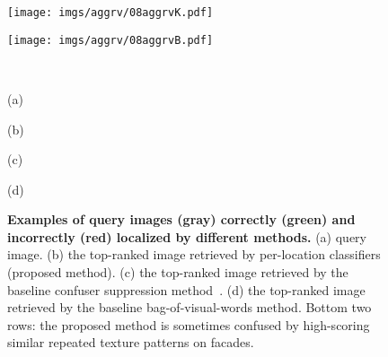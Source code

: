 \begin{figure*}[!ht]
{\begin{minipage}{\subw}
		  \centerline{
		  \texttt{[image: imgs/aggrv/08aggrvK.pdf]}
		  }
		\end{minipage}
	 }
	 \colorbox{myGreen}{
		\begin{minipage}{\subw}
		  \centerline{
		  \texttt{[image: imgs/aggrv/08aggrvB.pdf]}
		  }
		\end{minipage}
	 }
	 \\
	 \begin{minipage}{0.23\linewidth}
		\centering
		(a)
	 \end{minipage}
	 \hspace{3mm}
	 \begin{minipage}{0.23\linewidth}
		\centering
		(b)
	 \end{minipage}
	 \begin{minipage}{0.23\linewidth}
		\centering
		(c)
	 \end{minipage}
	 \begin{minipage}{0.23\linewidth}
		\centering
		(d)
	 \end{minipage}
	 \caption{
		{\bf Examples of query images (gray) correctly (green) and incorrectly (red) localized by different methods.} \;(a) query image. \;(b) the top-ranked image retrieved by per-location classifiers (proposed method). \;(c) the top-ranked image retrieved by the baseline confuser suppression method~\cite{Knopp2010}. \;(d) the top-ranked image retrieved by the baseline bag-of-visual-words method.  Bottom two rows: the proposed method is sometimes confused by high-scoring similar repeated texture patterns on facades.
  	}
	\label{fig:demo1}
 \end{figure*}